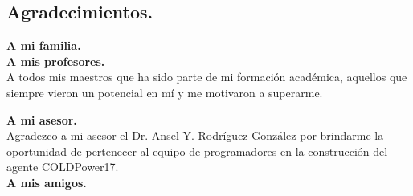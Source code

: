 \begin{center}
	\section*{Agradecimientos.}   
\end{center}
\setcounter{page}{1}

\textbf{A mi familia.}
\\

\textbf{A mis profesores.}
\\
A todos mis maestros que ha sido parte de mi formación académica, aquellos que siempre vieron un potencial en mí y me motivaron a superarme.

\textbf{A mi asesor.}
\\

Agradezco a mi asesor el Dr. Ansel Y. Rodríguez González por brindarme la oportunidad de pertenecer al equipo de programadores en la construcción del agente COLDPower17.
\\

\textbf{A mis amigos.}
\\

